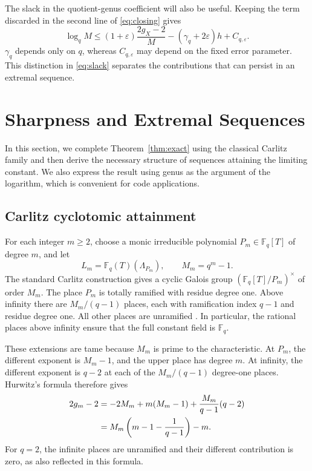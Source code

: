 \documentclass[12pt,onecolumn,draftclsnofoot,letterpaper]{IEEEtran}
\theoremstyle{remark}
\newcommand{\F}{\mathbb F}
\begin{document}
The slack in the quotient-genus coefficient will also be useful. Keeping the term discarded in the second line of \eqref{eq:closing} gives
\begin{equation}
 \log_qM\le
 (1+\varepsilon)\frac{2g_X-2}{M}
 -(\gamma_q+2\varepsilon)h+C_{q,\varepsilon}.
 \label{eq:slack}
\end{equation}
$\gamma_q$ depends only on $q$, whereas $C_{q,\varepsilon}$ may depend on the fixed error parameter. This distinction in \eqref{eq:slack} separates the contributions that can persist in an extremal sequence.

\section{Sharpness and Extremal Sequences}\label{sec:sharp}
In this section, we complete Theorem~\ref{thm:exact} using the classical Carlitz family and then derive the necessary structure of sequences attaining the limiting constant. We also express the result using genus as the argument of the logarithm, which is convenient for code applications.

\subsection{Carlitz cyclotomic attainment}
For each integer $m\ge2$, choose a monic irreducible polynomial $P_m\in\F_q[T]$ of degree $m$, and let
\begin{equation}
 L_m=\F_q(T)(\Lambda_{P_m}),\qquad M_m=q^m-1.
 \label{eq:carlitzfield}
\end{equation}
The standard Carlitz construction gives a cyclic Galois group
$(\F_q[T]/P_m)^\times$ of order $M_m$. The place $P_m$ is totally ramified with residue degree one. Above infinity there are $M_m/(q-1)$ places, each with ramification index $q-1$ and residue degree one. All other places are unramified \cite[Prop.~2.1]{maxing}. In particular, the rational places above infinity ensure that the full constant field is $\F_q$.

These extensions are tame because $M_m$ is prime to the characteristic. At $P_m$, the different exponent is $M_m-1$, and the upper place has degree $m$. At infinity, the different exponent is $q-2$ at each of the $M_m/(q-1)$ degree-one places. Hurwitz's formula therefore gives
\begin{align}
 2g_m-2
 &=-2M_m+m(M_m-1)+\frac{M_m}{q-1}(q-2)\notag\\
 &=M_m\left(m-1-\frac1{q-1}\right)-m.
 \label{eq:carlitzgenus}
\end{align}
For $q=2$, the infinite places are unramified and their different contribution is zero, as also reflected in this formula.
\end{document}
